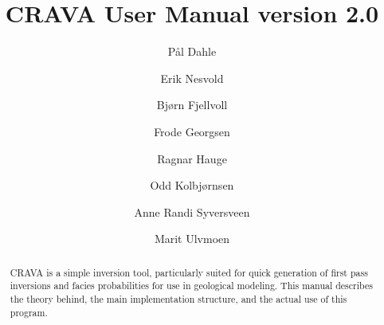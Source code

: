 \documentclass[screen,note,long,backref,indentpar]{nrdoc}
\title{CRAVA User Manual version 2.0}
\author{P{\aa}l Dahle\and Erik Nesvold \and Bj{\o}rn Fjellvoll \and Frode Georgsen\and Ragnar Hauge\and Odd Kolbj{\o}rnsen\and Anne Randi Syversveen\and Marit Ulvmoen}
\begin{document}
\maketitle

\begin{abstract}
CRAVA is a simple inversion tool, particularly suited for quick generation of first pass inversions and facies probabilities for use in geological modeling. This manual describes the theory behind, the main implementation structure, and the actual use of this program.
\end{abstract}

\tableofcontents
\clearemptydoublepage



\newpage

\newpage

\newpage



\appendix



\newpage

\newpage




\end{document}
